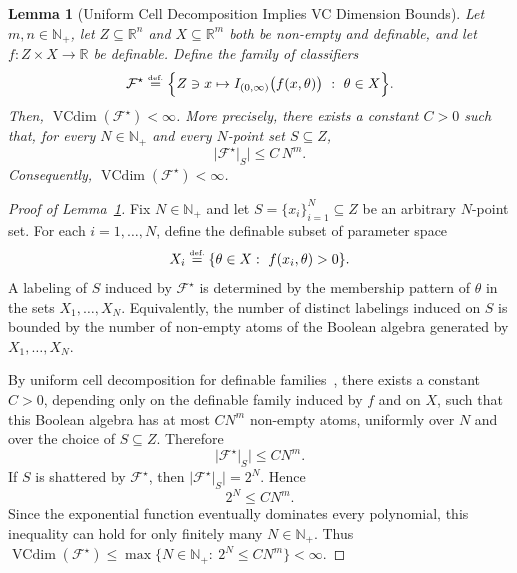 \documentclass{article}
\newcommand{\eqdef}{\ensuremath{\stackrel{\mbox{\upshape\tiny def.}}{=}}}
\theoremstyle{plain}
\newtheorem{lemma}[theorem]{Lemma}
\theoremstyle{definition}
\theoremstyle{remark}
\theoremstyle{plain}
\numberwithin{thm}{section}
\theoremstyle{definition}
\numberwithin{equation}{section}
\begin{document}
\begin{lemma}[Uniform Cell Decomposition Implies VC Dimension Bounds]
\label{lem:VC_Dim_Bounds}
Let $m,n\in \mathbb{N}_+$, let $Z\subseteq \mathbb{R}^n$ and $X\subseteq \mathbb{R}^m$ both be non-empty and definable, and let
$f:Z\times X\to \mathbb{R}$ be definable.
Define the family of classifiers
\[
\mathcal{F}^{\star}
\eqdef
\Big\{
Z\ni x\mapsto I_{(0,\infty)}\big(f(x,\theta)\big)
\ :\ \theta\in X
\Big\}.
\]
Then, $\operatorname{VCdim}(\mathcal{F}^{\star})<\infty$.
More precisely, there exists a constant $C>0$ such that, for every $N\in\mathbb{N}_+$ and every
$N$-point set $S\subseteq Z$,
\begin{equation}
\label{eq:uniform_cell}
        \big|\mathcal{F}^{\star}|_S\big|
    \le 
        C\, N^m
    .
\end{equation}
Consequently,
$
    \operatorname{VCdim}(\mathcal{F}^{\star})
<
    \infty
$.
\end{lemma}

\begin{proof}[Proof of Lemma~\ref{lem:VC_Dim_Bounds}]
Fix $N\in\mathbb{N}_+$ and let $S=\{x_i\}_{i=1}^N\subseteq Z$ be an arbitrary $N$-point set.  For each
$i=1,\dots,N$, define the definable subset of parameter space
\[
    X_i
    \eqdef
    \{\theta\in X:\ f(x_i,\theta)>0\}.
\]
A labeling of $S$ induced by $\mathcal{F}^{\star}$ is determined by the membership pattern of $\theta$ in the
sets $X_1,\dots,X_N$.  Equivalently, the number of distinct labelings induced on $S$ is bounded by the number of
non-empty atoms of the Boolean algebra generated by $X_1,\dots,X_N$.

By uniform cell decomposition for definable families~\cite[Theorem~2.10]{coste1999introduction}, there exists a
constant $C>0$, depending only on the definable family induced by $f$ and on $X$, such that this Boolean algebra has
at most $C N^m$ non-empty atoms, uniformly over $N$ and over the choice of $S\subseteq Z$.  Therefore
\[
    \big|\mathcal{F}^{\star}|_S\big|
    \le C N^m.
\]
If $S$ is shattered by $\mathcal{F}^{\star}$, then $\big|\mathcal{F}^{\star}|_S\big|=2^N$.  Hence
\[
    2^N\le C N^m.
\]
Since the exponential function eventually dominates every polynomial, this inequality can hold for only finitely
many $N\in\mathbb{N}_+$.  Thus
$
    \operatorname{VCdim}(\mathcal{F}^{\star})
    \le
    \max\{N\in\mathbb{N}_+:\ 2^N\le C N^m\}
    <\infty
$.
\end{proof}
\end{document}
